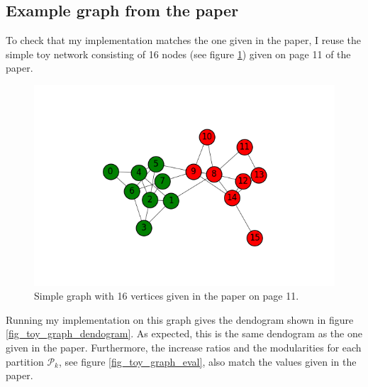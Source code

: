 \documentclass[12pt]{article}
\theoremstyle{definition}
\begin{document}
\subsection{Example graph from the paper}
To check that my implementation matches the one given in the paper, I reuse the simple toy network consisting of 16 nodes (see figure \ref{fig_toy_graph}) given on page 11 of the paper.
\begin{figure}
	\includegraphics[scale=0.6]{toy_graph}
	\centering
	\caption{Simple graph with 16 vertices given in the paper on page 11.}
	\label{fig_toy_graph}
\end{figure}
Running my implementation on this graph gives the dendogram shown in figure \ref{fig_toy_graph_dendogram}. As expected, this is the same dendogram as the one given in the paper. Furthermore, the increase ratios and the modularities for each  partition $\mathcal{P}_k$, see figure \ref{fig_toy_graph_eval}, also match the values given in the paper.
\end{document}
